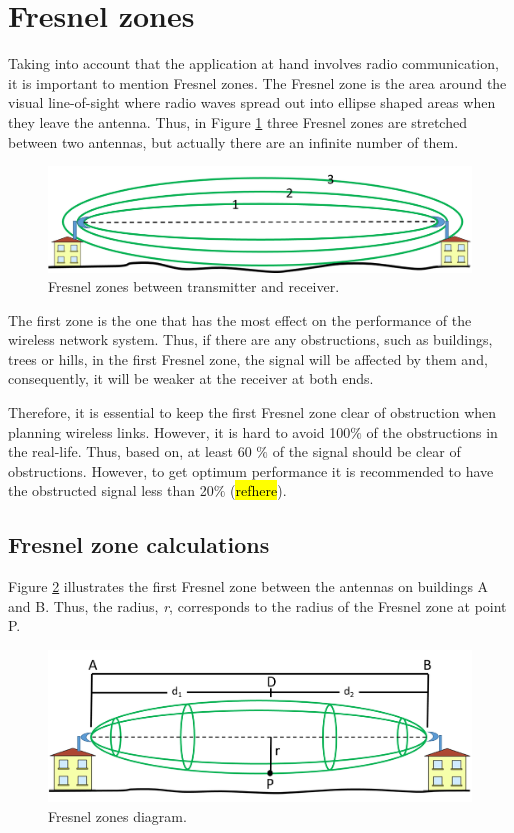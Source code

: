 \section{Fresnel zones}\label{sec:fresnel}
Taking into account that the application at hand involves radio communication, it is important to mention Fresnel zones. The Fresnel zone is the area around the visual line-of-sight where radio waves spread out into ellipse shaped areas when they leave the antenna. Thus, in Figure \ref{fig:3fresnel_zones} three Fresnel zones are stretched between two antennas, but actually there are an infinite number of them.

\begin{figure}[H]
	\centering
	\includegraphics[scale=0.65]{figures/fresnel_zones.png}
	\caption{Fresnel zones between transmitter and receiver.}
	\label{fig:3fresnel_zones}
\end{figure}

The first zone is the one that has the most effect on the performance of the wireless network system. Thus, if there are any obstructions, such as buildings, trees or hills, in the first Fresnel zone, the signal will be affected by them and, consequently, it will be weaker at the receiver at both ends.

Therefore, it is essential to keep the first Fresnel zone clear of obstruction when planning wireless links. However, it is hard to avoid 100$\%$ of the obstructions in the real-life. Thus, based on, at least 60 $\%$ of the signal should be clear of obstructions. However, to get optimum performance it is recommended to have the obstructed signal less than 20$\%$ \cite{proxim} (\hl{refhere}).

\subsection{Fresnel zone calculations}
Figure \ref{fig:fresnel_zones} illustrates the first Fresnel zone between the antennas on buildings A and B. Thus, the radius, \textit{r}, corresponds to the radius of the Fresnel zone at point P. 

\begin{figure}[H]
	\centering
	\includegraphics[scale=0.60]{figures/fresnel_zone.png}
	\caption{Fresnel zones diagram.}
	\label{fig:fresnel_zones}
\end{figure} 

